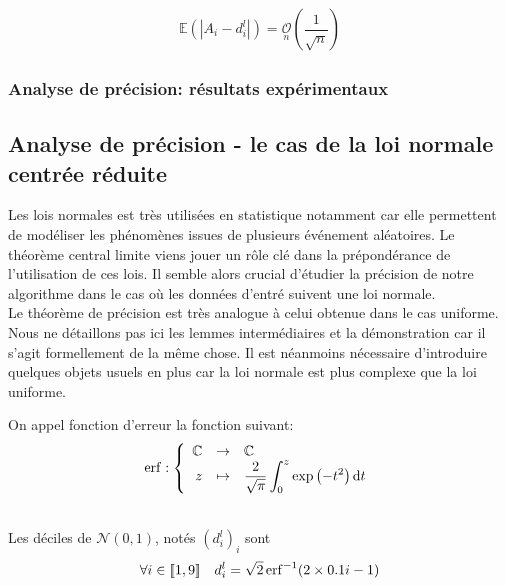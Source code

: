 \begin{align*}
    \mathbb E\left( |A_i - d_i^l| \right) = \underset{n}{\mathcal O}\left(\dfrac{1}{\sqrt{n}}\right)
\end{align*}

\subsubsection{Analyse de précision: résultats expérimentaux}

\subsection{Analyse de précision - le cas de la loi normale centrée réduite}

Les lois normales est très utilisées en statistique notamment car elle permettent de modéliser les phénomènes issues de plusieurs événement aléatoires. Le théorème central limite viens jouer un rôle clé dans la prépondérance de l'utilisation de ces lois. Il semble alors crucial d'étudier la précision de notre algorithme dans le cas où les données d'entré suivent une loi normale.\\

Le théorème de précision est très analogue à celui obtenue dans le cas uniforme. Nous ne détaillons pas ici les lemmes intermédiaires et la démonstration car il s'agit formellement de la même chose. Il est néanmoins nécessaire d'introduire quelques objets usuels en plus car la loi normale est plus complexe que la loi uniforme.\\


On appel fonction d'erreur la fonction suivant:
\[
        \erf: \left\{ 
        \begin{array}[]{rcl}
            \C &\to& \C\\
            z &\mapsto& \dfrac{2}{\sqrt \pi} \displaystyle\int_0^z\exp\left( -t^2 \right)\dt t
        \end{array}
        \right.
\]

\label{val_deciles_n01}\\
Les déciles de \(\mathcal N(0,1)\), notés \((d^l_i)_i\) sont 
\[
    \forall i \in \inte 1 9 \quad d^l_i = \sqrt{2} \erf^{-1}(2\times 0.1i - 1)
\]

